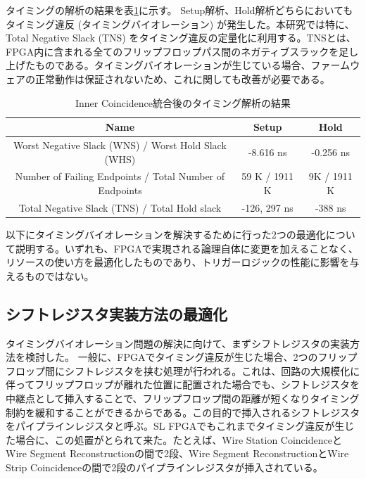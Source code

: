タイミングの解析の結果を表\ref{tab:timing_before}に示す。
Setup解析、Hold解析どちらにおいてもタイミング違反 (タイミングバイオレーション) が発生した。本研究では特に、Total Negative Slack (TNS) をタイミング違反の定量化に利用する。TNSとは、FPGA内に含まれる全てのフリップフロップパス間のネガティブスラックを足し上げたものである。タイミングバイオレーションが生じている場合、ファームウェアの正常動作は保証されないため、これに関しても改善が必要である。
\begin{table}[]
    \centering
    \caption{Inner Coincidence統合後のタイミング解析の結果}
    \label{tab:timing_before}
    \begin{tabular}{|c|c|c|}
    \hline
    Name                                                    & Setup         & Hold        \\ \hline\hline
    Worst Negative Slack (WNS) / Worst Hold Slack (WHS)     & -8.616 ns     & -0.256 ns   \\ \hline
    Number of Failing Endpoints / Total Number of Endpoints & 59 K / 1911 K & 9K / 1911 K \\ \hline
    Total Negative Slack (TNS) / Total Hold slack           & -126, 297 ns  & -388 ns     \\ \hline
    \end{tabular}
\end{table}

以下にタイミングバイオレーションを解決するために行った2つの最適化について説明する。いずれも、FPGAで実現される論理自体に変更を加えることなく、リソースの使い方を最適化したものであり、トリガーロジックの性能に影響を与えるものではない。

\subsection{シフトレジスタ実装方法の最適化}
タイミングバイオレーション問題の解決に向けて、まずシフトレジスタの実装方法を検討した。
一般に、FPGAでタイミング違反が生じた場合、2つのフリップフロップ間にシフトレジスタを挟む処理が行われる。これは、回路の大規模化に伴ってフリップフロップが離れた位置に配置された場合でも、シフトレジスタを中継点として挿入することで、フリップフロップ間の距離が短くなりタイミング制約を緩和することができるからである。この目的で挿入されるシフトレジスタをパイプラインレジスタと呼ぶ。SL FPGAでもこれまでタイミング違反が生じた場合に、この処置がとられて来た。たとえば、Wire Station CoincidenceとWire Segment Reconstructionの間で2段、Wire Segment ReconstructionとWire Strip Coincidenceの間で2段のパイプラインレジスタが挿入されている。

